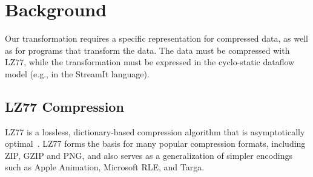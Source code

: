 \newcommand{\x}{\hspace{1.3pt}} %
\newcommand{\concat}[0]{\bullet}               %
\newcommand{\name}[1]{~~\hfill\framebox{#1}}   %

\newcommand{\skiptop}[0]{\vspace{-13pt}\\}   %
\newcommand{\skiptopa}[0]{\vspace{-1pt}\\}   %
\newcommand{\skiptopb}[0]{\vspace{-3pt}\\}   %
\newcommand{\skipbot}[0]{\vspace{-3pt}\\}    %

\newcommand{\tup}[2]{\langle#1, #2\rangle}

\newcommand{\pos}[0]{\mbox{\it pos}}

\newcommand{\tab}[0]{\mbox{~~~~}}


\section{Background}

Our transformation requires a specific representation for compressed
data, as well as for programs that transform the data.  The data must
be compressed with LZ77, while the transformation must be expressed in
the cyclo-static dataflow model (e.g., in the StreamIt language).

\subsection{LZ77 Compression}

LZ77 is a lossless, dictionary-based compression algorithm that is
asymptotically optimal~\cite{wyner94optimal}.  LZ77 forms the basis
for many popular compression formats, including ZIP, GZIP and PNG, and
also serves as a generalization of simpler encodings such as Apple
Animation, Microsoft RLE, and Targa.

